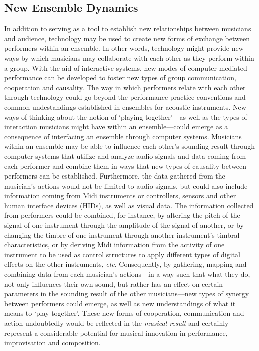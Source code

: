 \subsection{New Ensemble Dynamics}

In addition to serving as a tool to establish new relationships between musicians and audience, technology may be used to create new forms of exchange between performers within an ensemble. In other words, technology might provide new ways by which musicians may collaborate with each other as they perform within a group. With the aid of interactive systems, new modes of computer-mediated performance can be developed to foster new types of group communication, cooperation and causality. The way in which performers relate with each other through technology could go beyond the performance-practice conventions and common undestandings established in ensembles for acoustic instruments. New ways of thinking about the notion of `playing together'---as well as the types of interaction musicians might have within an ensemble---could emerge as a consequence of interfacing an ensemble through computer systems. Musicians within an ensemble may be able to influence each other's sounding result through computer systems that utilize and analyze audio signals and data coming from each performer and combine them in ways that new types of causality between performers can be established. Furthermore, the data gathered from the musician's actions would not be limited to audio signals, but could also include information coming from Midi instruments or controllers, sensors and other human interface devices (HIDs), as well as visual data. The information collected from performers could be combined, for instance, by altering the pitch of the signal of one instrument through the amplitude of the signal of another, or by changing the timbre of one instrument through another instrument's timbral characteristics, or by deriving Midi information from the activity of one instrument to be used as control structures to apply different types of digital effects on the other instruments, \emph{etc}. Consequently, by gathering, mapping and combining data from each musician's actions---in a way such that what they do, not only influences their own sound, but rather has an effect on certain parameters in the sounding result of the other musicians---new types of synergy between performers could emerge, as well as new understandings of what it means to `play together'. These new forms of cooperation, communication and action undoubtedly would be reflected in the \emph{musical result} and certainly represent a considerable potential for musical innovation in performance, improvisation and composition.

